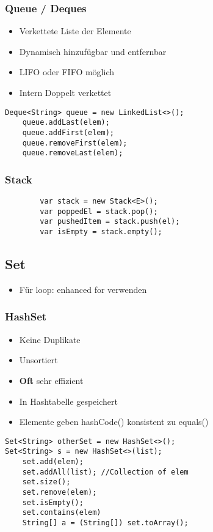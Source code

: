 \begin{multicols*}{5}
		\subsubsection{Queue / Deques}
		\begin{itemize}
			\item Verkettete Liste der Elemente
			\item Dynamisch hinzufügbar und entfernbar
			\item LIFO oder FIFO möglich
			\item Intern Doppelt verkettet
		\end{itemize}
		\begin{lstlisting}
Deque<String> queue = new LinkedList<>();
	queue.addLast(elem);
	queue.addFirst(elem);
	queue.removeFirst(elem);
	queue.removeLast(elem);
		\end{lstlisting}

	\subsubsection{Stack}
	\begin{lstlisting}
		var stack = new Stack<E>();
		var poppedEl = stack.pop();
		var pushedItem = stack.push(el);
		var isEmpty = stack.empty();
	\end{lstlisting}


	\subsection{Set}
		\begin{itemize}
			\item Für loop: enhanced for verwenden
		\end{itemize}
		\subsubsection{HashSet}
		\begin{itemize}
			\item Keine Duplikate
			\item Unsortiert 
			\item \textbf{Oft} sehr effizient
			\item In Hashtabelle gespeichert
			\item Elemente geben hashCode() konsistent zu equals()
		\end{itemize}
		\begin{lstlisting}
Set<String> otherSet = new HashSet<>();
Set<String> s = new HashSet<>(list);
	set.add(elem);
	set.addAll(list); //Collection of elem
	set.size();
	set.remove(elem);
	set.isEmpty();
	set.contains(elem)
	String[] a = (String[]) set.toArray();
		\end{lstlisting}

\end{multicols*}
